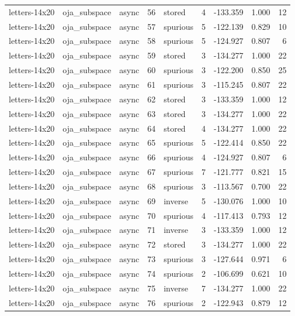 \begin{tabular}{lllrlrrrr}
letters-14x20 & oja\_subspace & async & 56 & stored & 4 & -133.359 & 1.000 & 12 \\
letters-14x20 & oja\_subspace & async & 57 & spurious & 5 & -122.139 & 0.829 & 10 \\
letters-14x20 & oja\_subspace & async & 58 & spurious & 5 & -124.927 & 0.807 & 6 \\
letters-14x20 & oja\_subspace & async & 59 & stored & 3 & -134.277 & 1.000 & 22 \\
letters-14x20 & oja\_subspace & async & 60 & spurious & 3 & -122.200 & 0.850 & 25 \\
letters-14x20 & oja\_subspace & async & 61 & spurious & 3 & -115.245 & 0.807 & 22 \\
letters-14x20 & oja\_subspace & async & 62 & stored & 3 & -133.359 & 1.000 & 12 \\
letters-14x20 & oja\_subspace & async & 63 & stored & 3 & -134.277 & 1.000 & 22 \\
letters-14x20 & oja\_subspace & async & 64 & stored & 4 & -134.277 & 1.000 & 22 \\
letters-14x20 & oja\_subspace & async & 65 & spurious & 5 & -122.414 & 0.850 & 22 \\
letters-14x20 & oja\_subspace & async & 66 & spurious & 4 & -124.927 & 0.807 & 6 \\
letters-14x20 & oja\_subspace & async & 67 & spurious & 7 & -121.777 & 0.821 & 15 \\
letters-14x20 & oja\_subspace & async & 68 & spurious & 3 & -113.567 & 0.700 & 22 \\
letters-14x20 & oja\_subspace & async & 69 & inverse & 5 & -130.076 & 1.000 & 10 \\
letters-14x20 & oja\_subspace & async & 70 & spurious & 4 & -117.413 & 0.793 & 12 \\
letters-14x20 & oja\_subspace & async & 71 & inverse & 3 & -133.359 & 1.000 & 12 \\
letters-14x20 & oja\_subspace & async & 72 & stored & 3 & -134.277 & 1.000 & 22 \\
letters-14x20 & oja\_subspace & async & 73 & spurious & 3 & -127.644 & 0.971 & 6 \\
letters-14x20 & oja\_subspace & async & 74 & spurious & 2 & -106.699 & 0.621 & 10 \\
letters-14x20 & oja\_subspace & async & 75 & inverse & 7 & -134.277 & 1.000 & 22 \\
letters-14x20 & oja\_subspace & async & 76 & spurious & 2 & -122.943 & 0.879 & 12 \\

\end{tabular}
